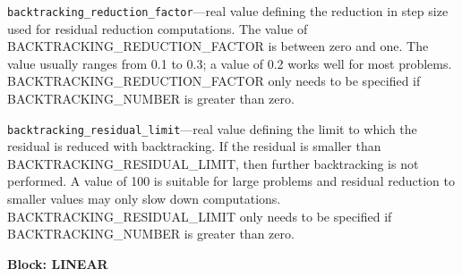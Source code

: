 \begin{description}
\item \texttt{backtracking\_reduction\_factor}---real value defining the reduction in step size used for residual reduction computations. The value of BACKTRACKING\_REDUCTION\_FACTOR is between zero and one. The value usually ranges from 0.1 to 0.3; a value of 0.2 works well for most problems. BACKTRACKING\_REDUCTION\_FACTOR only needs to be specified if BACKTRACKING\_NUMBER is greater than zero.

\item \texttt{backtracking\_residual\_limit}---real value defining the limit to which the residual is reduced with backtracking. If the residual is smaller than BACKTRACKING\_RESIDUAL\_LIMIT, then further backtracking is not performed. A value of 100 is suitable for large problems and residual reduction to smaller values may only slow down computations. BACKTRACKING\_RESIDUAL\_LIMIT only needs to be specified if BACKTRACKING\_NUMBER is greater than zero.

\end{description}
\item \textbf{Block: LINEAR}

